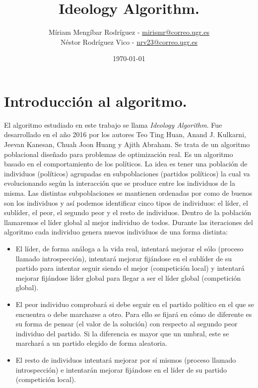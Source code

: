 \documentclass[12pt]{article}
\title{Ideology Algorithm.}
\author{Míriam Mengíbar Rodríguez - \href{mailto:mirismr@correo.ugr.es}{mirismr@correo.ugr.es}\\Néstor Rodríguez Vico - \href{mailto:nrv23@correo.ugr.es}{nrv23@correo.ugr.es}}
\date{\today}
\numberwithin{figure}{section} %
\numberwithin{table}{section} %
\begin{document}
	\maketitle
	
	\setlength{\belowdisplayskip}{5pt} 
	\setlength{\belowdisplayshortskip}{5pt}
	\setlength{\abovedisplayskip}{5pt} 
	\setlength{\abovedisplayshortskip}{5pt}

	\section[Introducción al algoritmo.]{Introducción al algoritmo.}
	
	El algoritmo estudiado en este trabajo se llama \textit{Ideology Algorithm}. Fue desarrollado en el año 2016 por los autores Teo Ting Huan, Anand J. Kulkarni, Jeevan Kanesan, Chuah Joon Huang y Ajith Abraham. Se trata de un algoritmo poblacional diseñado para problemas de optimización real. Es un algoritmo basado en el comportamiento de los políticos. La idea es tener una población de individuos (políticos) agrupadas en subpoblaciones (partidos políticos) la cual va evolucionando según la interacción que se produce entre los individuos de la misma. Las distintas subpoblaciones se mantienen ordenadas por como de buenos son los individuos y así podemos identificar cinco tipos de individuos: el líder, el sublíder, el peor, el segundo peor y el resto de individuos. Dentro de la población llamaremos el líder global al mejor individuo de todos. Durante las iteraciones del algoritmo cada individuo genera nuevos individuos de una forma distinta:
	
	\begin{itemize}
	\item El líder, de forma análoga a la vida real, intentará mejorar el sólo (proceso llamado introspección), intentará mejorar fijándose en el sublíder de su partido para intentar seguir siendo el mejor (competición local) y intentará mejorar fijándose líder global para llegar a ser el líder global (competición global).
	\item El peor individuo comprobará si debe seguir en el partido político en el que se encuentra o debe marcharse a otro. Para ello se fijará en cómo de diferente es su forma de pensar (el valor de la solución) con respecto al segundo peor individuo del partido. Si la diferencia es mayor que un umbral, este se marchará a un partido elegido de forma aleatoria.
	\item El resto de individuos intentará mejorar por sí mismos (proceso llamado introspección) e intentarán mejorar fijándose en el líder de su partido (competición local).
	\end{itemize}
	
\end{document}
